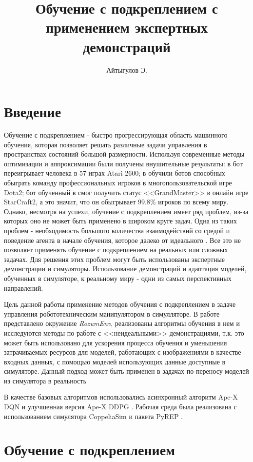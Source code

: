 \documentclass{mipt-thesis-bs}
\title{Обучение с подкреплением с применением экспертных демонстраций}
\author{Айтыгулов Э.}
\begin{document}
\frontmatter
\titlecontents

\chapter{Введение}
Обучение с подкреплением - быстро прогрессирующая область машинного обучения, которая позволяет решать различные задачи управления в пространствах состояний большой размерности. Используя современные методы оптимизации и аппроксимации были получены внушительные результаты: в \cite{Agent-57} бот переигрывает человека в 57 играх Atari 2600; в \cite{OpenAI} обучили ботов способных обыграть команду профессиональных игроков в многопользовательской игре Dota2; бот обученный в \cite{DeepMind} смог получить статус <<GrandMaster>> в онлайн игре StarCraft2, а это значит, что он обыгрывает $99.8\%$ игроков по всему миру. Однако, несмотря на успехи, обучение с подкреплением имеет ряд проблем, из-за которых оно не может быть применено в широком круге задач. Одна из таких проблем - необходимость большого количества взаимодействий со средой и поведение агента в начале обучения, которое далеко от идеального . Все это не позволяет применять обучение с подкреплением на реальных или сложных задачах. Для решения этих проблем могут быть использованы экспертные демонстрации и симуляторы. Использование демонстраций и адаптация моделей, обученных в симуляторе, к реальному миру - одни из самых перспективных направлений.

Цель данной работы применение методов обучения с подкреплением в задаче управления робототехническим манипулятором в симулляторе. В работе представлено окружение \textit{RozumEnv}, реализованы алгоритмы обучения в нем и исследуются методы по работе с <<неидеальными>> демонстрациями, т.к. это может быть использовано для ускорения процесса обучения и уменьшения затрачиваемых ресурсов для моделей, работающих с изображениями в качестве входных данных, с помощью моделей использующих данные доступные в симуляторе. 
Данный подход может быть применен в задачах по переносу моделей из симулятора в реальность

В качестве базовых алгоритмов использовались асинхронный алгоритм Ape-X DQN и улучшенная версия Ape-X DDPG  \cite{apex}. Рабочая среда была реализована с использованием симулятора CoppeliaSim и пакета PyREP \cite{pyrep}.

\mainmatter
\chapter{Обучение с подкреплением}
\end{document}
